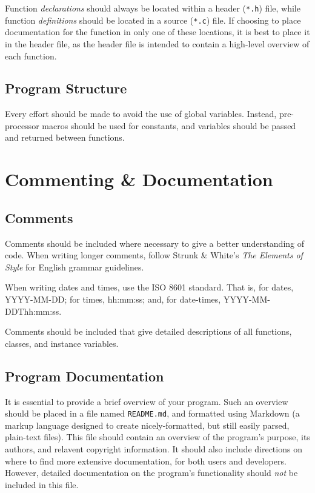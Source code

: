 \documentclass[11pt]{article}
\begin{document}
Function \emph{declarations} should always be located within a header
(\texttt{*.h}) file, while function \emph{definitions} should be located
in a source (\texttt{*.c}) file. If choosing to place documentation for
the function in only one of these locations, it is best to place it in
the header file, as the header file is intended to contain a high-level
overview of each function.

\subsection{Program Structure}\label{program-structure}

Every effort should be made to avoid the use of global variables.
Instead, pre-processor macros should be used for constants, and
variables should be passed and returned between functions.

\section{Commenting \& Documentation}\label{commenting-documentation}

\subsection{Comments}\label{comments}

Comments should be included where necessary to give a better
understanding of code. When writing longer comments, follow Strunk \&
White's \emph{The Elements of Style} for English grammar guidelines.

When writing dates and times, use the ISO 8601 standard. That is, for
dates, YYYY-MM-DD; for times, hh:mm:ss; and, for date-times,
YYYY-MM-DDThh:mm:ss.

Comments should be included that give detailed descriptions of all
functions, classes, and instance variables.

\subsection{Program Documentation}\label{program-documentation}

It is essential to provide a brief overview of your program. Such an
overview should be placed in a file named \texttt{README.md}, and
formatted using Markdown (a markup language designed to create
nicely-formatted, but still easily parsed, plain-text files). This file
should contain an overview of the program's purpose, its authors, and
relavent copyright information. It should also include directions on
where to find more extensive documentation, for both users and
developers. However, detailed documentation on the program's
functionality should \emph{not} be included in this file.
\end{document}
